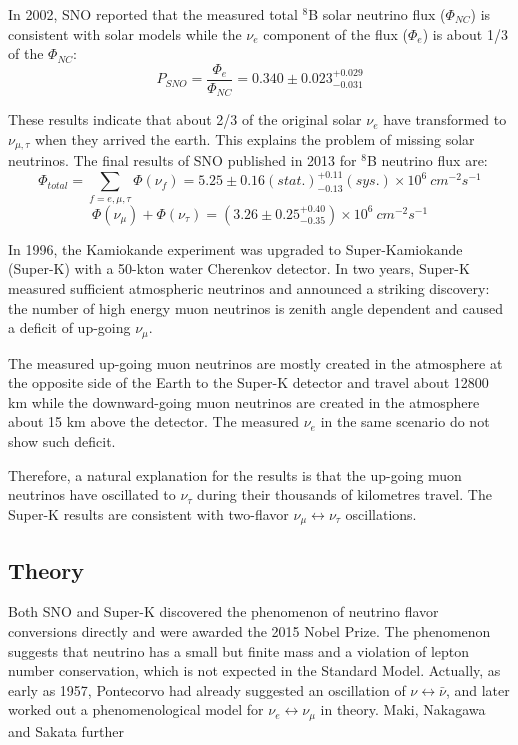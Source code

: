 \documentclass[preprint,12pt]{elsarticle}
\begin{document}
In 2002, SNO reported that the measured total $^8$B solar neutrino flux ($\Phi_{NC}$) is consistent with solar models while the $\nu_e$ component of the flux ($\Phi_e$) is about 1/3 of the $\Phi_{NC}$\cite{SNO}:
\[
P_{SNO} = \frac{\Phi_e}{\Phi_{NC}}= 0.340\pm0.023^{+0.029}_{-0.031}
\]

These results indicate that about 2/3 of the original solar $\nu_e$ have transformed to $\nu_{\mu,\tau}$ when they arrived the earth. This explains the problem of missing solar neutrinos. The final results of SNO published in 2013\cite{SNOresult} for $^8$B neutrino flux are:
\[
\Phi_{total} = \sum_{f=e,\mu,\tau}\Phi(\nu_f)= 5.25\pm0.16(stat.)_{-0.13}^{+0.11}(sys.)\times10^6~cm^{-2}s^{-1}
\]
\[\Phi(\nu_\mu)+\Phi(\nu_\tau)=(3.26\pm0.25^{+0.40}_{-0.35})\times 10^6~cm^{-2}s^{-1}
\]

In 1996, the Kamiokande experiment was upgraded to Super-Kamiokande (Super-K) with a 50-kton water Cherenkov detector. In two years, Super-K measured sufficient atmospheric neutrinos and announced a striking discovery: the number of high energy muon neutrinos is zenith angle dependent and caused a deficit of up-going $\nu_\mu$. 

The measured up-going muon neutrinos are mostly created in the atmosphere at the opposite side of the Earth to the Super-K detector and travel about 12800 km while the downward-going muon neutrinos are created in the atmosphere about 15 km above the detector. The measured $\nu_e$ in the same scenario do not show such deficit.

Therefore, a natural explanation for the results is that the up-going muon neutrinos have oscillated to $\nu_\tau$ during their thousands of kilometres travel. The Super-K results are consistent with two-flavor $\nu_\mu\leftrightarrow\nu_\tau$ oscillations\cite{superK}.

\subsection{Theory}
Both SNO and Super-K discovered the phenomenon of neutrino flavor conversions directly and were awarded the 2015 Nobel Prize. The phenomenon suggests that neutrino has a small but finite mass and a violation of lepton number conservation, which is not expected in the Standard Model. Actually, as early as 1957, Pontecorvo had already suggested an oscillation of $\nu\leftrightarrow\bar{\nu}$, and later worked out a phenomenological model for $\nu_e\leftrightarrow\nu_\mu$ in theory\cite{nobeldoc}. Maki, Nakagawa and Sakata further 
\end{document}
